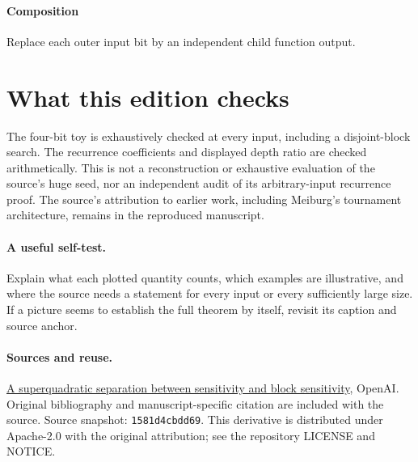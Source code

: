 \documentclass[11pt]{article}
\begin{document}
\paragraph{Composition}Replace each outer input bit by an independent child function output.
\section*{What this edition checks}The four-bit toy is exhaustively checked at every input, including a disjoint-block search. The recurrence coefficients and displayed depth ratio are checked arithmetically. This is not a reconstruction or exhaustive evaluation of the source's huge seed, nor an independent audit of its arbitrary-input recurrence proof. The source's attribution to earlier work, including Meiburg's tournament architecture, remains in the reproduced manuscript.
\paragraph{A useful self-test.} Explain what each plotted quantity counts, which examples are illustrative, and where the source needs a statement for every input or every sufficiently large size. If a picture seems to establish the full theorem by itself, revisit its caption and source anchor.\paragraph{Sources and reuse.}\href{https://github.com/openai/math/tree/1581d4cbdd69a0faf34b2089614fe2a814316a6a/preprints/A-superquadratic-separation-between-sensitivity-and-block-sensitivity-September-25-2026}{A superquadratic separation between sensitivity and block sensitivity}, OpenAI. Original bibliography and manuscript-specific citation are included with the source. Source snapshot: \texttt{1581d4cbdd69}. This derivative is distributed under Apache-2.0 with the original attribution; see the repository LICENSE and NOTICE.
\end{document}
